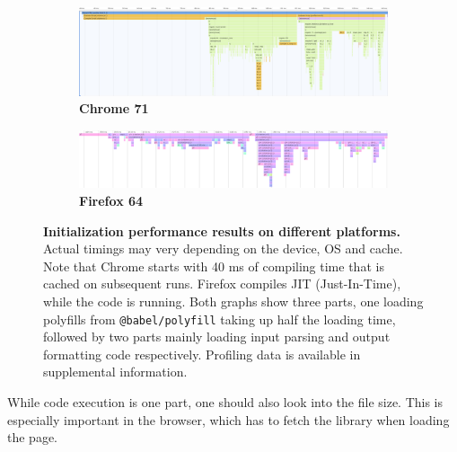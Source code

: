 \documentclass[fleqn,10pt,lineno]{wlpeerj} %
\begin{document}
\begin{figure}[bt!]
\begin{subfigure}{1.1\textwidth}
  \centering
  \includegraphics[width=\linewidth]{figures/perf_chrome.png}
\caption{\textbf{Chrome 71}}
  \label{fig:perf-chrome}
\end{subfigure}
\begin{subfigure}{1.1\textwidth}
  \centering
  \includegraphics[width=\linewidth]{figures/perf_ff.png}
  \caption{\textbf{Firefox 64}}
  \label{fig:perf-ff}
\end{subfigure}
\caption{\textbf{Initialization performance results on different platforms.}
Actual timings may very depending on the device, OS and cache. Note that Chrome starts with 40 ms of compiling time that is cached on subsequent runs. Firefox compiles JIT (Just-In-Time), while the code is running. Both graphs show three parts, one loading polyfills from \texttt{@babel/polyfill} taking up half the loading time, followed by two parts mainly loading input parsing and output formatting code respectively. Profiling data is available in supplemental information.}
\label{fig:perf}
\end{figure}

While code execution is one part, one should also look into the file size. This is especially important in the browser, which has to fetch the library when loading the page.
\end{document}
